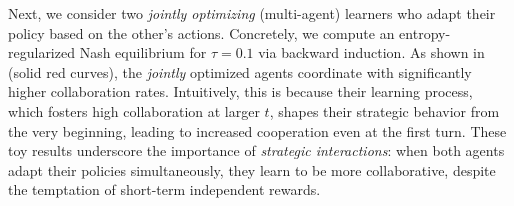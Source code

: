 Next, we consider two \textit{jointly optimizing} (multi-agent) learners who adapt their policy based on the other's actions. Concretely, we compute an  entropy-regularized Nash equilibrium for \(\tau=0.1\) via backward induction. 
As shown in  (solid red curves), the \textit{jointly} optimized agents coordinate with significantly higher collaboration rates. Intuitively, this is because their learning process, which fosters high collaboration at larger $t$, shapes their strategic behavior from the very beginning, leading to increased cooperation even at the first turn. 
These toy results underscore the importance of \textit{strategic interactions}: when both agents adapt their policies simultaneously, they learn to be more collaborative,  despite the temptation of short-term independent rewards. 
\vspace{-2mm}













